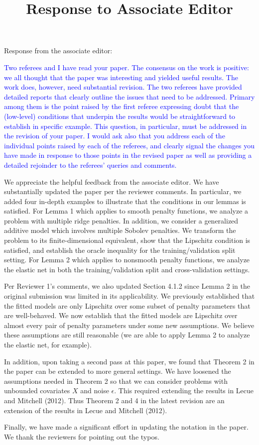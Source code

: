 \documentclass[]{article}
\title{Response to Associate Editor}
\newcommand{\overall}[1]{\textcolor{blue}{#1}}
\begin{document}
	
	\maketitle
	
	
	Response from the associate editor:
	
	\overall{
		Two referees and I have read your paper. The consensus on the work is positive: we all thought that the paper was interesting and yielded useful results. The work does, however, need substantial revision. The two referees have provided detailed reports that clearly outline the issues that need to be addressed. Primary among them is the point raised by the first referee expressing doubt that the (low-level) conditions that underpin the results would be straightforward to establish in specific example. This question, in particular, must be addressed in the revision of your paper. I would ask also that you address each of the individual points raised by each of the referees, and clearly signal the changes you have made in response to those points in the revised paper as well as providing a detailed rejoinder to the referees' queries and comments.
	}

	We appreciate the helpful feedback from the associate editor.
	We have substantially updated the paper per the reviewer comments.
	In particular, we added four in-depth examples to illustrate that the conditions in our lemmas is satisfied.
	For Lemma 1 which applies to smooth penalty functions, we analyze a problem with multiple ridge penalties.
	In addition, we consider a generalized additive model which involves multiple Sobolev penalties.
	We transform the problem to its finite-dimensional equivalent, show that the Lipschitz condition is satisfied, and establish the oracle inequality for the training/validation split setting.
	For Lemma 2 which applies to nonsmooth penalty functions, we analyze the elastic net in both the training/validation split and cross-validation settings.
	
	Per Reviewer 1's comments, we also updated Section 4.1.2 since Lemma 2 in the original submission was limited in its applicability.
	We previously established that the fitted models are only Lipschitz over some subset of penalty parameters that are well-behaved.
	We now establish that the fitted models are Lipschitz over almost every pair of penalty parameters under some new assumptions.
	We believe these assumptions are still reasonable (we are able to apply Lemma 2 to analyze the elastic net, for example).

	In addition, upon taking a second pass at this paper, we found that Theorem 2 in the paper can be extended to more general settings.
	We have loosened the assumptions needed in Theorem 2 so that we can consider problems with unbounded covariates $X$ and noise $\epsilon$.
	This required extending the results in Lecue and Mitchell (2012).
	Thus Theorem 2 and 4 in the latest revision are an extension of the results in Lecue and Mitchell (2012).

	Finally, we have made a significant effort in updating the notation in the paper. We thank the reviewers for pointing out the typos.
\end{document}
